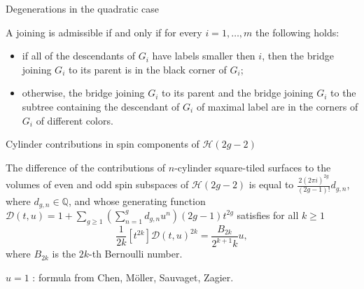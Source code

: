\documentclass[11pt, aspectratio=149]{beamer}
\newcommand{\Rm}{\mathbb{R}}
\newcommand{\Hc}{\mathcal{H}}
\begin{document}
\begin{frame}{Degenerations in the quadratic case}
\begin{figure}
    \centering
    \def\svgwidth{0.55\textwidth}
    
    
\end{figure}

    {\tiny 
    A joining is admissible if and only if for every $i=1,\ldots, m$ the following holds:
\begin{itemize}
    \item if all of the descendants of $G_i$ have labels smaller then $i$, then the bridge joining $G_i$ to its parent is in the black corner of $G_i$;
    \item otherwise, the bridge joining $G_i$ to its parent and the bridge joining $G_i$ to the subtree containing the descendant of $G_i$ of maximal label are in the corners of $G_i$ of different colors.
\end{itemize}
    }
\end{frame}


\begin{frame}{Cylinder contributions in spin components of $\Hc(2g-2)$}
\begin{theorem}[Y., 2024+]
    The difference of the contributions of $n$-cylinder square-tiled surfaces to the volumes of even and odd spin subspaces of $\mathcal{H}(2g-2)$ is equal to $\frac{2(2\pi i)^{2g}}{(2g-1)!}d_{g,n}$, where $d_{g,n} \in \mathbb{Q}$, and whose generating function
        $\mathcal{D}(t,u) = 1 + \sum_{g\geq 1} \left(\sum_{n=1}^g d_{g,n} u^n \right)(2g-1) t^{2g}$
        satisfies for all $k\geq 1$
        \begin{equation*}
        \label{eq:spin-D-series-relation}
            \frac{1}{2k} [t^{2k}] \mathcal{D}(t,u)^{2k} = \frac{B_{2k}}{2^{k+1} k} u,
        \end{equation*}
    where $B_{2k}$ is the $2k$-th Bernoulli number.
\end{theorem}

 $u=1$ : formula from Chen, M\"{o}ller, Sauvaget, Zagier.
\end{frame}

%
%
%    
%
%
%
%
%
\end{document}
